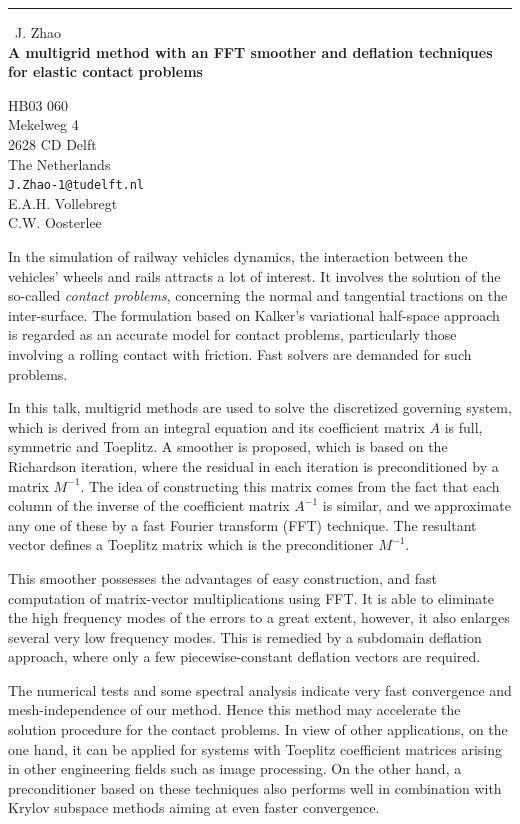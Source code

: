\documentclass{report}
\begin{document}
\begin{center}
\rule{6in}{1pt} \
{\large J. Zhao \\
{\bf A multigrid method with an FFT smoother and deflation techniques for elastic contact problems}}

HB03 060 \\ Mekelweg 4 \\ 2628 CD Delft \\ The Netherlands
\\
{\tt J.Zhao-1@tudelft.nl}\\
E.A.H. Vollebregt\\
C.W.  Oosterlee\end{center}

In the simulation of railway vehicles dynamics, the interaction between
the vehicles' wheels and rails attracts a lot of interest. It involves
the solution of the so-called {\it contact problems}, concerning the
normal and tangential tractions on the inter-surface. The formulation
based on Kalker's variational half-space approach is regarded as an
accurate model for contact problems, particularly those involving a
rolling contact with friction. Fast solvers are demanded for such
problems.


In this talk, multigrid methods are used to solve the discretized
governing system, which is derived from an integral equation and its
coefficient matrix $A$ is full, symmetric and Toeplitz. A smoother is
proposed, which is based on the Richardson iteration, where the residual
in each iteration is preconditioned by a matrix $M^{-1}$. The idea of
constructing this matrix comes from the fact that each column of the
inverse of the coefficient matrix $A^{-1}$ is similar, and we approximate
any one of these by a fast Fourier transform (FFT) technique. The
resultant vector defines a Toeplitz matrix which is the preconditioner
$M^{-1}$.


This smoother possesses the advantages of easy construction, and fast
computation of matrix-vector multiplications using FFT. It is able to
eliminate the high frequency modes of the errors to a great extent,
however, it also enlarges several very low frequency modes. This is
remedied by a subdomain deflation approach, where only a few
piecewise-constant deflation vectors are required.


The numerical tests and some spectral analysis indicate very fast
convergence and mesh-independence of our method. Hence this method may
accelerate the solution procedure for the contact problems. In view of
other applications, on the one hand, it can be applied for systems with
Toeplitz coefficient matrices arising in other engineering fields such as
image processing. On the other hand, a preconditioner based on these
techniques also performs well in combination with Krylov subspace methods
aiming at even faster convergence.
\end{document}
